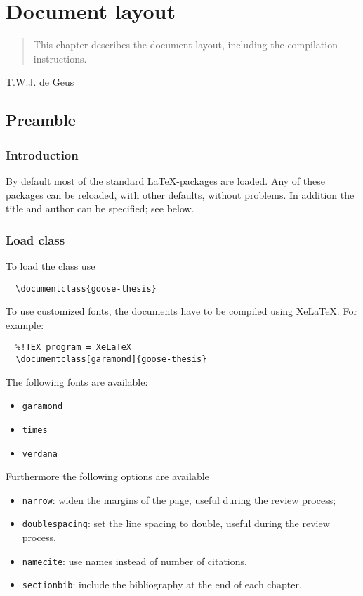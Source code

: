 
\chapter{Document layout}

\begin{frontmatter}

\begin{abstract}
This chapter describes the document layout, including the compilation instructions.
\end{abstract}


\begin{remark}
  T.W.J. de Geus
\end{remark}

\end{frontmatter}

\section{Preamble}

\subsection{Introduction}

By default most of the standard \LaTeX-packages are loaded. Any of these packages can be reloaded, with other defaults, without problems. In addition the title and author can be specified; see below.

\subsection{Load class}

To load the class use
\begin{verbatim}
  \documentclass{goose-thesis}
\end{verbatim}
%
To use customized fonts, the documents have to be compiled using XeLaTeX. For example:
\begin{verbatim}
  %!TEX program = XeLaTeX
  \documentclass[garamond]{goose-thesis}
\end{verbatim}
%
The following fonts are available:
%
\begin{itemize}
  \item \texttt{garamond}
  \item \texttt{times}
  \item \texttt{verdana}
\end{itemize}
%
%
Furthermore the following options are available
%
\begin{itemize}
  \item \texttt{narrow}: widen the margins of the page, useful during the review process;
  \item \texttt{doublespacing}: set the line spacing to double, useful during the review process.
  \item \texttt{namecite}: use names instead of number of citations.
  \item \texttt{sectionbib}: include the bibliography at the end of each chapter.
\end{itemize}
%

